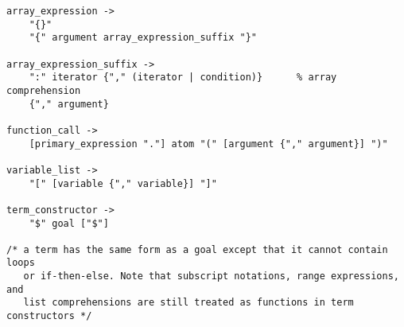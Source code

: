 \begin{scriptsize}
\begin{verbatim}
array_expression ->
    "{}"
    "{" argument array_expression_suffix "}"    

array_expression_suffix ->
    ":" iterator {"," (iterator | condition)}      % array comprehension
    {"," argument} 

function_call ->
    [primary_expression "."] atom "(" [argument {"," argument}] ")"

variable_list ->
    "[" [variable {"," variable}] "]"

term_constructor ->
    "$" goal ["$"]

/* a term has the same form as a goal except that it cannot contain loops 
   or if-then-else. Note that subscript notations, range expressions, and  
   list comprehensions are still treated as functions in term constructors */

\end{verbatim}
\end{scriptsize}
\ignore{

}
